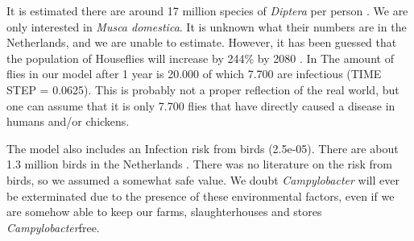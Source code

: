 It is estimated there are around 17 million species of \textit{Diptera} per person \parencite{gorman_trillions_2017}. We are only interested in \textit{Musca domestica}. It is unknown what their numbers are in the Netherlands, and we are unable to estimate. However, it has been guessed that the population of Houseflies will increase by 244\% by 2080 \parencite{mcalister_secret_2017}. In The amount of flies in our model after 1 year is 20.000 of which 7.700 are infectious (TIME STEP = 0.0625). This is probably not a proper reflection of the real world, but one can assume that it is only 7.700 flies that have directly caused a disease in humans and/or chickens.

The model also includes an Infection risk from birds (2.5e-05). There are about 1.3 million birds in the Netherlands \parencite{noauthor_miljoenen_2019}. There was no literature on the risk from birds, so we assumed a somewhat safe value. We doubt \textit{Campylobacter} will ever be exterminated due to the presence of these environmental factors, even if we are somehow able to keep our farms, slaughterhouses and stores \textit{Campylobacter}free.

